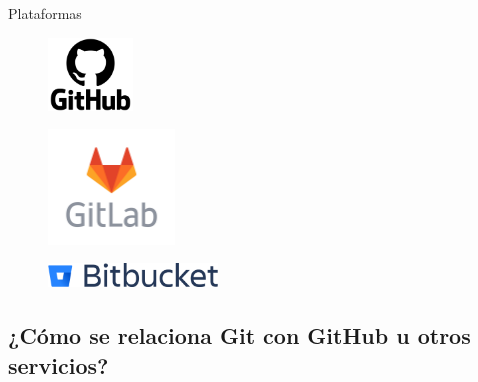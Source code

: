 \documentclass{beamer}
\begin{document}
\begin{frame}{Plataformas} 
 
  \begin{figure}
    \includegraphics[width=0.2\textwidth]{images/logo_github.png}
  \end{figure}

  \begin{figure}
    \includegraphics[width=0.3\textwidth]{images/logo_gitlab.png}
  \end{figure}

  \begin{figure}
    \includegraphics[width=0.4\textwidth]{images/logo_Bitbucket.png}
  \end{figure}
 
\end{frame}

\subsection{¿Cómo se relaciona Git con GitHub u otros servicios?} 
\end{document}
